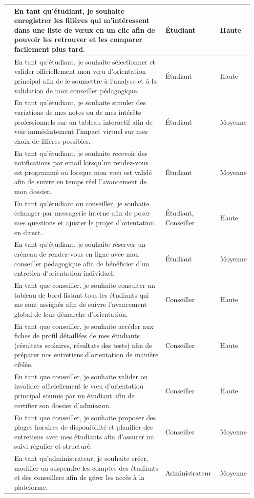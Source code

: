 \begin{center}
\begin{longtable}{|>{\centering\arraybackslash}p{0.8cm}|>{\RaggedRight\arraybackslash}p{8.5cm}|>{\centering\arraybackslash}p{2.8cm}|>{\centering\arraybackslash}p{1.6cm}|}
\hline
11 & En tant qu'étudiant, je souhaite enregistrer les filières qui m'intéressent dans une liste de vœux en un clic afin de pouvoir les retrouver et les comparer facilement plus tard. & Étudiant & Haute \\
\hline
12 & En tant qu'étudiant, je souhaite sélectionner et valider officiellement mon vœu d'orientation principal afin de le soumettre à l'analyse et à la validation de mon conseiller pédagogique. & Étudiant & Haute \\
\hline
13 & En tant qu'étudiant, je souhaite simuler des variations de mes notes ou de mes intérêts professionnels sur un tableau interactif afin de voir immédiatement l'impact virtuel sur mes choix de filières possibles. & Étudiant & Moyenne \\
\hline
14 & En tant qu'étudiant, je souhaite recevoir des notifications par email lorsqu'un rendez-vous est programmé ou lorsque mon vœu est validé afin de suivre en temps réel l'avancement de mon dossier. & Étudiant & Moyenne \\
\hline
15 & En tant qu'étudiant ou conseiller, je souhaite échanger par messagerie interne afin de poser mes questions et ajuster le projet d'orientation en direct. & Étudiant, Conseiller & Haute \\
\hline
16 & En tant qu'étudiant, je souhaite réserver un créneau de rendez-vous en ligne avec mon conseiller pédagogique afin de bénéficier d'un entretien d'orientation individuel. & Étudiant & Moyenne \\
\hline
17 & En tant que conseiller, je souhaite consulter un tableau de bord listant tous les étudiants qui me sont assignés afin de suivre l'avancement global de leur démarche d'orientation. & Conseiller & Haute \\
\hline
18 & En tant que conseiller, je souhaite accéder aux fiches de profil détaillées de mes étudiants (résultats scolaires, résultats des tests) afin de préparer nos entretiens d'orientation de manière ciblée. & Conseiller & Haute \\
\hline
19 & En tant que conseiller, je souhaite valider ou invalider officiellement le vœu d'orientation principal soumis par un étudiant afin de certifier son dossier d'admission. & Conseiller & Haute \\
\hline
20 & En tant que conseiller, je souhaite proposer des plages horaires de disponibilité et planifier des entretiens avec mes étudiants afin d'assurer un suivi régulier et structuré. & Conseiller & Moyenne \\
\hline
21 & En tant qu'administrateur, je souhaite créer, modifier ou suspendre les comptes des étudiants et des conseillers afin de gérer les accès à la plateforme. & Administrateur & Moyenne \\

\end{longtable}
\end{center}

